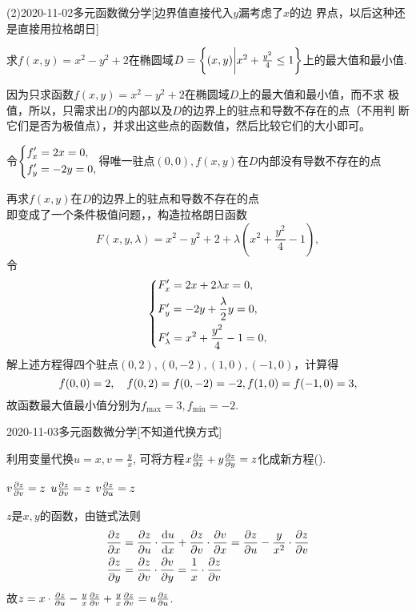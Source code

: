 \documentclass{ctexart}
\begin{document}
\begin{mathques}(2){2020-11-02}{多元函数微分学}[边界值直接代入$y$漏考虑了$x$的边
  界点，以后这种还是直接用拉格朗日]
\begin{ques}
  求$f(x, y) = x^2 - y^2 + 2$在椭圆域$D = \Bqty{(x, y)\bigg|x^2 + \frac{y^2}{4}
  \le 1}$上的最大值和最小值.
\end{ques}
\begin{solu}
  \begin{mathideabox}
    因为只求函数$f(x, y) = x^2 - y^2 + 2$在椭圆域$D$上的最大值和最小值，而不求
    极值，所以，只需求出$D$的内部以及$D$的边界上的驻点和导数不存在的点（不用判
    断它们是否为极值点），并求出这些点的函数值，然后比较它们的大小即可。
  \end{mathideabox}
  令$
  \begin{dcases}
  f'_x = 2x = 0,\\
  f'_y = -2y = 0,
  \end{dcases}
  $得唯一驻点$(0, 0), f(x, y)$在$D$内部没有导数不存在的点

  再求$f(x, y)$在$D$的边界上的驻点和导数不存在的点\\
  即变成了一个条件极值问题，，构造拉格朗日函数
  \[
    F(x, y, \lambda) = x^2 - y^2 + 2 + \lambda(x^2 + \frac{y^2}{4} - 1),
  \]
  令
  \[
  \begin{dcases}
  F'_x = 2x + 2\lambda x = 0,\\
  F'_y = -2y + \frac{\lambda}{2}y = 0,\\
  F'_{\lambda} = x^2 + \frac{y^2}{4} - 1 = 0,
  \end{dcases}
  \]
  解上述方程得四个驻点$(0, 2), (0, -2), (1, 0), (-1, 0)$，计算得
  \[
  f(0, 0) = 2\qc f(0, 2) = f(0, -2) = -2, f(1, 0) = f(-1, 0) = 3,
  \]
  故函数最大值最小值分别为$f_{\max} = 3, f_{\min} = -2.$
\end{solu}
\end{mathques}

\begin{mathques}{2020-11-03}{多元函数微分学}[不知道代换方式]
\begin{ques}
  利用变量代换$u = x, v = \frac{y}{x}$, 可将方程$x\pdv{z}{x} + y\pdv{z}{y} =
  z$化成新方程(\quad).
  \begin{multichoice}
    \task {}
    \task $v\pdv{z}{v} = z$
    \task $u\pdv{z}{v} = z$
    \task $v\pdv{z}{u} = z$
  \end{multichoice}
\end{ques}
\begin{solu}
  $z$是$x, y$的函数，由链式法则
  \begin{align*}
    \pdv{z}{x} &= \pdv{z}{u}\cdot \dv{u}{x} + \pdv{z}{v}\cdot \pdv{v}{x} =
    \pdv{z}{u} - \frac{y}{x^2}\cdot\pdv{z}{v}\\
    \pdv{z}{y} &= \pdv{z}{v}\cdot \pdv{v}{y} = \frac{1}{x}\cdot \pdv{z}{v}
  \end{align*}
  故$z = x\cdot \pdv{z}{u} - \frac{y}{x}\pdv{z}{v} + \frac{y}{x}\pdv{z}{v} =
  u\pdv{z}{u}$.
\end{solu}
\end{mathques}
\end{document}
